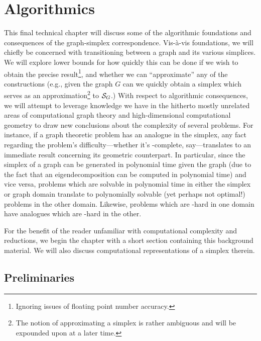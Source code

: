 \chapter{Algorithmics}
\label{chap:algorithmics}



This final technical chapter will discuss some of the algorithmic foundations and consequences of the graph-simplex correspondence. Vis-\`{a}-vis foundations, we will chiefly be concerned with transitioning between a graph and its various simplices. We will explore lower bounds for how quickly this can be done if we wish to obtain the precise result\footnote{Ignoring issues of floating point number accuracy.}, and whether we can ``approximate'' any of the constructions (e.g., given the graph $G$ can we quickly obtain a simplex which serves as an approximation\footnote{The notion of approximating a simplex is rather ambiguous and will be expounded upon at a later time.} to $\mathcal{S}_G$.) With respect to algorithmic consequences, we will attempt to leverage knowledge we have in the hitherto mostly unrelated areas of computational graph theory and high-dimensional computational geometry to draw new conclusions about the complexity of several problems. For instance, if a  graph theoretic problem has an analogue in the simplex, any fact regarding the problem's difficulty---whether it's \NP-complete, say---translates to an immediate result concerning its geometric counterpart. In particular, since the simplex of a graph can be generated in polynomial time given the graph (due to the fact that an eigendecomposition can be computed in polynomial time) and vice versa, problems which are solvable in polynomial time in either the simplex or graph domain  translate to polynomially solvable (yet perhaps not optimal!) problems in the other domain. Likewise, problems which are \NP-hard in one domain have analogues which are \NP-hard in the other. 

For the benefit of the reader unfamiliar with computational complexity and reductions, we begin the chapter with a short section containing this background material. We will also discuss computational representations of a simplex therein. 

\section{Preliminaries}
\label{sec:algorithmics_prelims}
